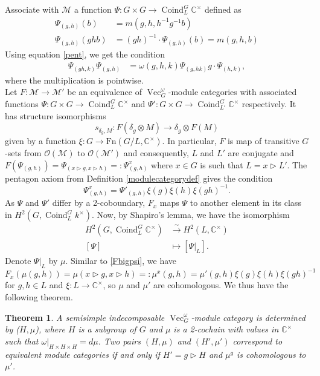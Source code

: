 \documentclass[a4paper, 10pt]{book}
\newtheorem{theorem}{Theorem}[chapter]
\theoremstyle{definition}
\numberwithin{equation}{chapter}
\newcommand\hit{\triangleright}
\newcommand\inv{^{-1}}
\newcommand\ot{\otimes}
\newcommand\Coind{\operatorname{Coind}}
\newcommand\Vect{\operatorname{Vec}}
\newcommand\kk{\mathbb C}
\newcommand\M{\mathcal{M}}
\newcommand\OO{\mathcal O}
\newcommand{\ra}\rightarrow
\begin{document}
Associate with $\M$ a function $\Psi: G\times G \rightarrow \Coind^G_L \kk^\times$ defined as
\begin{align}
	\Psi_{(g, h)}(b) &= m(g, h, h\inv g\inv b) \\
	\Psi_{(g,h)}(ghb) &= (gh)\inv\cdot\Psi_{(g,h)}(b) = m(g, h, b)
\end{align}
Using equation \eqref{pent}, we get the condition
\begin{align}
	\Psi_{(gh, k)}\Psi_{(g, h)}&= \omega(g, h, k)\Psi_{(g, hk)} g\cdot \Psi_{(h, k)}  ,
\end{align}
where the multiplication is pointwise. \\Let $F:\M\ra\M'$ be an equivalence of $\Vect^\omega_G$-module categories with associated functions $\Psi: G\times G \rightarrow \Coind^G_L \kk^\times $ and $\Psi': G\times G \rightarrow \Coind^G_{L'} \kk^\times$ respectively. It has structure isomorphisms \begin{equation*}
	s_{\delta_g, M}: F(\delta_g \ot M)\ra \delta_g\ot F(M)
\end{equation*} given by a function $\xi: G\ra \text{Fn} (G/L, \kk^\times)$. In particular, $F$ is map of transitive $G$-sets from $\OO(\M)$ to $\OO(\M')$ and consequently, $L$ and $L'$ are conjugate and $F(\Psi_{(g, h)}) = \Psi_{(x\hit g, x\hit h)} =: \Psi^x_{(g, h)}$ where $x\in G$ is such that $L=x\hit L'$. The pentagon axiom from Definition \ref{modulecategorydef} gives the condition \begin{equation}
	\Psi_{(g, h)}^x  = \Psi'_{(g, h)} \xi(g)\xi(h)\xi(gh)\inv.\label{Fbigpsi}
\end{equation} As $\Psi$ and $\Psi'$ differ by a 2-coboundary, $F_x$ maps $\Psi$ to another element in its class in $H^2(G, \Coind^G_L k^\times)$.  Now, by Shapiro's lemma, we have the isomorphism
\begin{align*}
 	H^2(G, \Coind^G_L \kk^\times) &\overset{\sim}\longrightarrow H^2(L, \kk^\times)\\
 	[\Psi] &\mapsto [\Psi|_L].
 \end{align*} 
Denote $\Psi|_L$ by $\mu$. Similar to \eqref{Fbigpsi}, we have \begin{equation*}
	F_x(\mu(g, h)) = \mu(x\hit g, x\hit h) =: \mu^x(g, h) = \mu'(g, h) \xi(g)\xi(h)\xi(gh)\inv
\end{equation*} for $g, h\in L$ and $\xi:L\ra \kk^\times$, so $\mu$ and $\mu'$ are cohomologous. We thus have the following theorem.
\begin{theorem}\label{simpleparam}
A semisimple indecomposable $\Vect^\omega_G$-module category is determined by ($H,\mu$), where $H$ is a subgroup of $G$ and $\mu$ is a 2-cochain with values in $\kk^\times$ such that $\omega|_{H\times H\times H} = d\mu$. Two pairs $(H, \mu)$ and $(H', \mu')$ correspond to equivalent module categories if and only if $H' = g\hit H$ and $\mu^g$ is cohomologous to $\mu'$.
\end{theorem}
\end{document}
